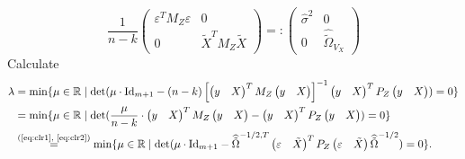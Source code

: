 \documentclass[11pt,hidelinks,a4paper]{article}
\newcommand{\BR}{{\mathbb{R}}}
\newcommand{\Id}{\mathrm{Id}}
\begin{document}
\begin{proofEnd}
\begin{equation}
        \frac{1}{n-k}
        \begin{pmatrix}
            \varepsilon^T M_Z \varepsilon & 0 \\
            0 & \tilde X^T M_Z \tilde X
        \end{pmatrix}        = : \begin{pmatrix}
        \hat\sigma^2 & 0 \\ 0 & \widehat{\tilde \Omega}_{V_X}
        \end{pmatrix}
    \end{equation}
    Calculate
    \begin{align*}
    \lambda %
    &= \min \{\mu \in \BR \mid \det( 
        \mu \cdot \Id_{m+1} - (n - k) \left[\begin{pmatrix} y & X \end{pmatrix}^T M_Z \begin{pmatrix} y & X \end{pmatrix}\right]^{-1} \begin{pmatrix} y & X \end{pmatrix}^T P_Z \begin{pmatrix} y & X \end{pmatrix}
    ) = 0 \}\\
    &= 
    \min \{ \mu \in \BR \mid \det( 
        \frac{\mu}{n-k} \cdot \begin{pmatrix} y & X \end{pmatrix}^T M_Z \begin{pmatrix} y & X \end{pmatrix} -  \begin{pmatrix} y & X \end{pmatrix}^T P_Z \begin{pmatrix} y & X \end{pmatrix}
    ) = 0\}\\
    &\overset{\text{(\ref{eq:clr1}, \ref{eq:clr2})}}{=} 
    \min \{ \mu \in \BR \mid \det( 
        \mu \cdot \Id_{m+1}
        - \widehat{\tilde \Omega}^{-1/2, T} \begin{pmatrix} \varepsilon & \tilde X \end{pmatrix}^T P_Z \begin{pmatrix} \varepsilon & \tilde X \end{pmatrix}  \widehat{\tilde \Omega}^{-1/2}
    ) = 0\}.
    \end{align*}


\end{proofEnd}
\end{document}
